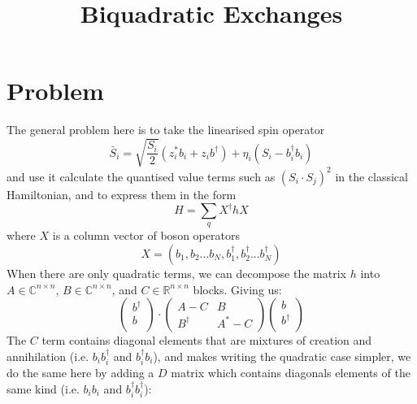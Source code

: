 \documentclass{article}
\title{Biquadratic Exchanges}
\date{}
\begin{document}
\maketitle

\section{Problem}

The general problem here is to take the linearised spin operator
\[\bar{S}_i = \sqrt{\frac{S_i}{2}} \left(z_i^* b_i + z_i b^\dagger \right) + \eta_i\left(S_i - b^\dagger_i b_i\right)\]
and use it calculate the quantised value terms such as $(S_i\cdot S_j)^2$ in the classical Hamiltonian, and to express them in the form
\[H = \sum_q X^\dagger h X\]
where $X$ is a column vector of boson operators
\[X = \left(b_1, b_2 ... b_N, b^\dagger_1, b^\dagger_2 ... b^\dagger_N\right)\]
When there are only quadratic terms, we can decompose the matrix $h$ into $A\in\mathbb{C}^{n\times n}$, $B\in\mathbb{C}^{n\times n}$, and $C\in\mathbb{R}^{n\times n}$ blocks. Giving us:
\begin{equation}
\left(\begin{array}{c}
     b^\dagger \\
     \hline
     b \\
\end{array}
\right) \cdot \left(
\begin{array}{cc}
A - C & B \\
B^\dagger & A^* - C
\end{array}
\right) \left(
\begin{array}{c}
     b \\
     \hline
     b^\dagger \\
\end{array}
\right)
\end{equation}
The $C$ term contains diagonal elements that are mixtures of creation and annihilation (i.e. $b_i b_i^\dagger$ and $b_i^\dagger b_i$), and makes writing the quadratic case simpler, we do the same here by adding a $D$ matrix which contains diagonals elements of the same kind (i.e. $b_i b_i$ and $b_i^\dagger b_i^\dagger$):
\end{document}
